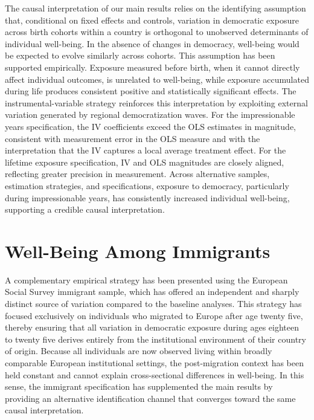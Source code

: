 \documentclass[11pt]{article}
\begin{document}
The causal interpretation of our main results relies on the identifying assumption that, conditional on fixed effects and controls, variation in democratic exposure across birth cohorts within a country is orthogonal to unobserved determinants of individual well-being. In the absence of changes in democracy, well-being would be expected to evolve similarly across cohorts. This assumption has been supported empirically. Exposure measured before birth, when it cannot directly affect individual outcomes, is unrelated to well-being, while exposure accumulated during life produces consistent positive and statistically significant effects. The instrumental-variable strategy reinforces this interpretation by exploiting external variation generated by regional democratization waves. For the impressionable years specification, the IV coefficients exceed the OLS estimates in magnitude, consistent with measurement error in the OLS measure and with the interpretation that the IV captures a local average treatment effect. For the lifetime exposure specification, IV and OLS magnitudes are closely aligned, reflecting greater precision in measurement. Across alternative samples, estimation strategies, and specifications, exposure to democracy, particularly during impressionable years, has consistently increased individual well-being, supporting a credible causal interpretation.



\section{Well-Being Among Immigrants}\label{Immigrants}

A complementary empirical strategy has been presented using the European Social Survey immigrant sample, which has offered an independent and sharply distinct source of variation compared to the baseline analyses. This strategy has focused exclusively on individuals who migrated to Europe after age twenty five, thereby ensuring that all variation in democratic exposure during ages eighteen to twenty five derives entirely from the institutional environment of their country of origin. Because all individuals are now observed living within broadly comparable European institutional settings, the post-migration context has been held constant and cannot explain cross-sectional differences in well-being. In this sense, the immigrant specification has supplemented the main results by providing an alternative identification channel that converges toward the same causal interpretation.
\end{document}
